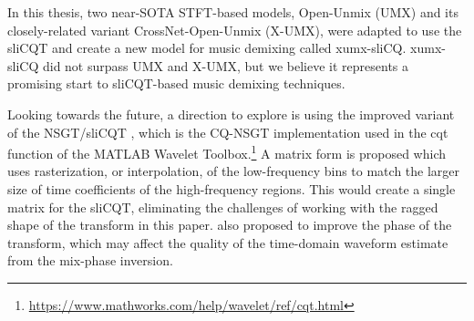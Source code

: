 \documentclass[report.tex]{subfiles}
\begin{document}
In this thesis, two near-SOTA STFT-based models, Open-Unmix (UMX) and its closely-related variant CrossNet-Open-Unmix (X-UMX), were adapted to use the sliCQT and create a new model for music demixing called xumx-sliCQ. xumx-sliCQ did not surpass UMX and X-UMX, but we believe it represents a promising start to sliCQT-based music demixing techniques.

Looking towards the future, a direction to explore is using the improved variant of the NSGT/sliCQT \parencite{variableq1}, which is the CQ-NSGT implementation used in the cqt function of the MATLAB Wavelet Toolbox.\footnote{\url{https://www.mathworks.com/help/wavelet/ref/cqt.html}} A matrix form is proposed which uses rasterization, or interpolation, of the low-frequency bins to match the larger size of time coefficients of the high-frequency regions. This would create a single matrix for the sliCQT, eliminating the challenges of working with the ragged shape of the transform in this paper. \textcite{variableq1} also proposed to improve the phase of the transform, which may affect the quality of the time-domain waveform estimate from the mix-phase inversion.
\end{document}
